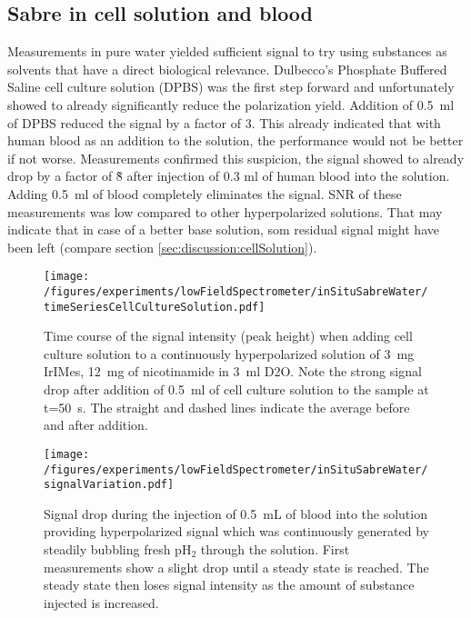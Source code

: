     \subsection{Sabre in cell solution and blood}
    Measurements in pure water yielded sufficient signal to try using substances as solvents that have a direct biological relevance. Dulbecco's Phosphate Buffered Saline cell culture solution (DPBS) was the first step forward and unfortunately showed to already significantly reduce the polarization yield. Addition of \SI{0.5}{\milli\litre} of DPBS reduced the signal by a factor of 3. This already indicated that with human blood as an addition to the solution, the performance would not be better if not worse. Measurements confirmed this suspicion, the signal showed to already drop by a factor of \~8 after injection of 0.3 ml of human blood into the solution. Adding \SI{0.5}{\milli\litre} of blood completely eliminates the signal. SNR of these measurements was low compared to other hyperpolarized solutions. That may indicate that in case of a better base solution, som residual signal might have been left (compare section \ref{sec:discussion:cellSolution}).
        \begin{figure}
            \texttt{[image: /figures/experiments/lowFieldSpectrometer/inSituSabreWater/timeSeriesCellCultureSolution.pdf]}
            \caption[Cell culture solution addition to hyperpolarized signal]{Time course of the signal intensity (peak height) when adding cell culture solution to a continuously hyperpolarized solution of \SI{3}{\milli\gram} IrIMes, \SI{12}{\milli\gram} of nicotinamide in \SI{3}{\milli\litre} D2O. Note the strong signal drop after addition of \SI{0.5}{\milli\litre} of cell culture solution to the sample at t=\SI{50}{\second}. The straight and dashed lines indicate the average before and after addition.}
            \label{chap:MaterialsAndMethods:bloodInjection}
        \end{figure}
        \begin{figure}
            \centering
            \texttt{[image: /figures/experiments/lowFieldSpectrometer/inSituSabreWater/signalVariation.pdf]}
            \caption[Blood addition to hyperpolarized signal]{Signal drop during the injection of \SI{0.5}{\milli\liter} of blood into the solution providing hyperpolarized signal which was continuously generated by steadily bubbling fresh pH$_2$ through the solution. First measurements show a slight drop until a steady state is reached. The steady state then loses signal intensity as the amount of substance injected is increased.}
            \label{chap:MaterialsAndMethods:bloodInjection2}
        \end{figure}
